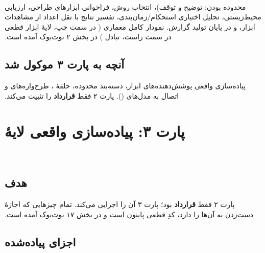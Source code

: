 ‫\documentclass[a4paper,12pt]{article}
\begin{document}
‫محدوده بودن: توضیح و توقف)، انتخاب روش، فراخوانی ابزارهای طراحی،
‫ارزیابی محیط‌زیستی، تحلیل اختیاری استحکام/زمان‌بندی، تفسیر نتایج با
‫نقل اعداد از مشاهدات ابزار، و در پایان تولید گزارش. نمودار کامل معماری
‫( در سمت چپ، لایهٔ ابزار قطعی در سمت راست، تبادل ) در
‫بخش ۲ نوت‌بوک آمده است.
‫
‫\subsection{آنچه به پارت ۳ موکول شد}
‫پیاده‌سازی واقعی پوشش‌دهنده‌های ابزار، دسته‌بند محدوده، حلقهٔ ،
‫طرح‌واره‌های  و اتصال به مدل‌های 
‫(). پارت ۲ فقط \textbf{قرارداد} را تثبیت می‌کند.
‫
‫\section{پارت ۳: پیاده‌سازی واقعی لایهٔ }
‫
‫\subsection{هدف}
‫پارت ۲ فقط \textbf{قرارداد} بود؛ پارت ۳ آن را اجرایی می‌کند. تمام
‫چیزهایی که  اجازهٔ دست‌زدن به آن‌ها را دارد، کدِ قطعی پایتون است
‫و در بخش ۱۷ نوت‌بوک آمده است.
‫
‫\subsection{اجزای پیاده‌شده}
\end{document}
